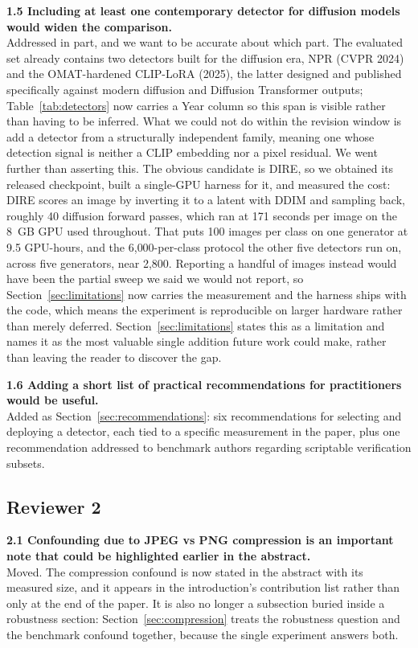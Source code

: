 \documentclass[3p,times,procedia]{elsarticle}
\begin{document}
\noindent\textbf{1.5 Including at least one contemporary detector for
diffusion models would widen the comparison.}\\[1pt]
Addressed in part, and we want to be accurate about which part. The
evaluated set already contains two detectors built for the diffusion era,
NPR (CVPR 2024) and the OMAT-hardened CLIP-LoRA (2025), the latter
designed and published specifically against modern diffusion and Diffusion
Transformer outputs; Table~\ref{tab:detectors} now carries a Year column
so this span is visible rather than having to be inferred. What we could
not do within the revision window is add a detector from a structurally
independent family, meaning one whose detection signal is neither a CLIP
embedding nor a pixel residual. We went further than asserting this. The
obvious candidate is DIRE, so we obtained its released checkpoint, built a
single-GPU harness for it, and measured the cost: DIRE scores an image by
inverting it to a latent with DDIM and sampling back, roughly 40 diffusion
forward passes, which ran at 171 seconds per image on the 8~GB GPU used
throughout. That puts 100 images per class on one generator at 9.5
GPU-hours, and the 6{,}000-per-class protocol the other five detectors run
on, across five generators, near 2{,}800. Reporting a handful of images
instead would have been the partial sweep we said we would not report, so
Section~\ref{sec:limitations} now carries the measurement and the harness ships with the code,
which means the experiment is reproducible on larger hardware rather than
merely deferred.
Section~\ref{sec:limitations} states this as a limitation and names it as
the most valuable single addition future work could make, rather than
leaving the reader to discover the gap.

\noindent\textbf{1.6 Adding a short list of practical recommendations for
practitioners would be useful.}\\[1pt]
Added as Section~\ref{sec:recommendations}: six recommendations for
selecting and deploying a detector, each tied to a specific measurement in
the paper, plus one recommendation addressed to benchmark authors
regarding scriptable verification subsets.

\subsection*{Reviewer 2}

\noindent\textbf{2.1 Confounding due to JPEG vs PNG compression is an
important note that could be highlighted earlier in the abstract.}\\[1pt]
Moved. The compression confound is now stated in the abstract with its
measured size, and it appears in the introduction's contribution list
rather than only at the end of the paper. It is also no longer a
subsection buried inside a robustness section: Section~\ref{sec:compression}
treats the robustness question and the benchmark confound together,
because the single experiment answers both.
\end{document}
